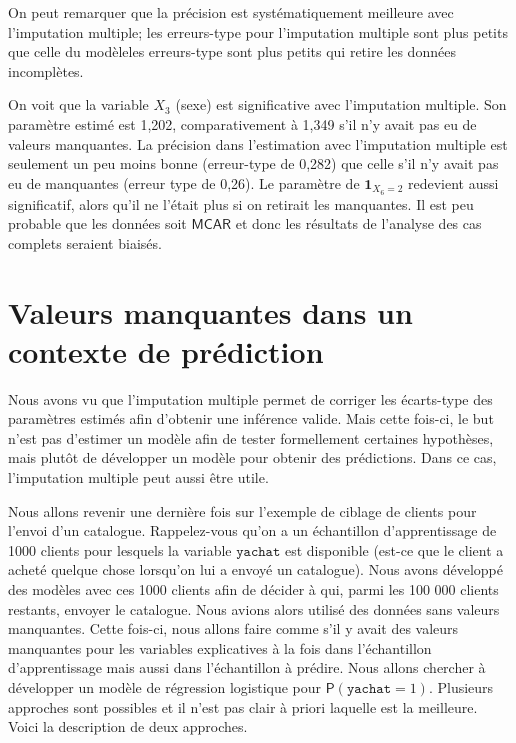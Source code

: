 \documentclass[
  11pt,
  letterpaper,
]{book}
\theoremstyle{definition}
\theoremstyle{definition}
\theoremstyle{definition}
\theoremstyle{remark}
\begin{document}
On peut remarquer que la précision est systématiquement meilleure avec l'imputation multiple; les erreurs-type pour l'imputation multiple sont plus petits que celle du modèleles erreurs-type sont plus petits qui retire les données incomplètes.

On voit que la variable \(X_3\) (sexe) est significative avec l'imputation multiple. Son paramètre estimé est 1,202, comparativement à 1,349 s'il n'y avait pas eu de valeurs manquantes. La précision dans l'estimation avec l'imputation multiple est seulement un peu moins bonne (erreur-type de 0,282) que celle s'il n'y avait pas eu de manquantes (erreur type de 0,26). Le paramètre de \({\mathbf 1}_{X_6=2}\) redevient aussi significatif, alors qu'il ne l'était plus si on retirait les manquantes. Il est peu probable que les données soit \(\mathsf{MCAR}\) et donc les résultats de l'analyse des cas complets seraient biaisés.

\hypertarget{valeurs-manquantes-dans-un-contexte-de-pruxe9diction}{%
\section{Valeurs manquantes dans un contexte de prédiction}\label{valeurs-manquantes-dans-un-contexte-de-pruxe9diction}}

Nous avons vu que l'imputation multiple permet de corriger les écarts-type des paramètres estimés afin d'obtenir une inférence valide. Mais cette fois-ci, le but n'est pas d'estimer un modèle afin de tester formellement certaines hypothèses, mais plutôt de développer un modèle pour obtenir des prédictions. Dans ce cas, l'imputation multiple peut aussi être utile.

Nous allons revenir une dernière fois sur l'exemple de ciblage de clients pour l'envoi d'un catalogue. Rappelez-vous qu'on a un échantillon d'apprentissage de 1000 clients pour lesquels la variable \(\texttt{yachat}\) est disponible (est-ce que le client a acheté quelque chose lorsqu'on lui a envoyé un catalogue). Nous avons développé des modèles avec ces 1000 clients afin de décider à qui, parmi les 100 000 clients restants, envoyer le catalogue. Nous avions alors utilisé des données sans valeurs manquantes. Cette fois-ci, nous allons faire comme s'il y avait des valeurs manquantes pour les variables explicatives à la fois dans l'échantillon d'apprentissage mais aussi dans l'échantillon à prédire. Nous allons chercher à développer un modèle de régression logistique pour \({\mathsf P}\left(\texttt{yachat}=1\right)\). Plusieurs approches sont possibles et il n'est pas clair à priori laquelle est la meilleure. Voici la description de deux approches.
\end{document}

